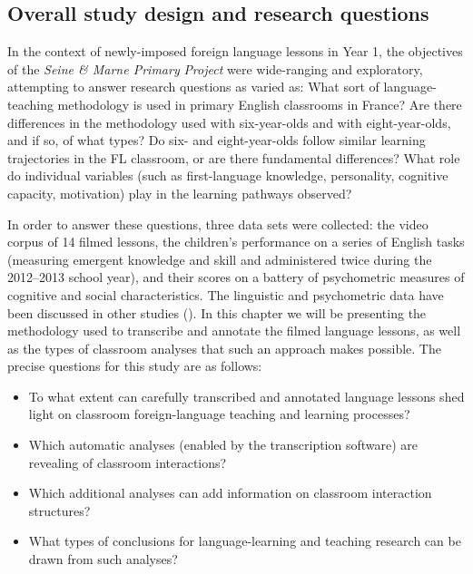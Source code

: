 \documentclass[output=paper,colorlinks,citecolor=brown,modfonts,nonflat]{../langscibook}
\begin{document}
\subsection{{Overall study design and research questions}\label{sec:hilton:3.2}}

In the context of newly-imposed foreign language lessons in Year 1, the objectives of the \textit{Seine \& Marne Primary} \textit{Project} were wide-ranging and exploratory, attempting to answer research questions as varied as: What sort of language-teaching methodology is used in primary English classrooms in France? Are there differences in the methodology used with six-year-olds and with eight-year-olds, and if so, of what types? Do six- and eight-year-olds follow similar learning trajectories in the FL classroom, or are there fundamental differences? What role do individual variables (such as first-language knowledge, personality, cognitive capacity, motivation) play in the learning pathways observed? 

In order to answer these questions, three data sets were collected: the video corpus of 14 filmed lessons, the children’s performance on a series of English tasks (measuring emergent knowledge and skill and administered twice during the 2012--2013 school year), and their scores on a battery of psychometric measures of cognitive and social characteristics. The linguistic and psychometric data have been discussed in other studies (\citealt{HiltonRoyer2014, HiltonEtAl2016, Hilton2017}). In this chapter we will be presenting the methodology used to transcribe and annotate the filmed language lessons, as well as the types of classroom analyses that such an approach makes possible. The precise questions for this study are as follows:

\begin{itemize}
\item To what extent can carefully transcribed and annotated language lessons shed light on classroom foreign-language teaching and learning processes?
\item Which automatic analyses (enabled by the transcription software) are revealing of classroom interactions?
\item Which additional analyses can add information on classroom interaction structures?
\end{itemize}
\begin{itemize}
\item What types of conclusions for language-learning and teaching research can be drawn from such analyses?
\end{itemize}
\end{document}
